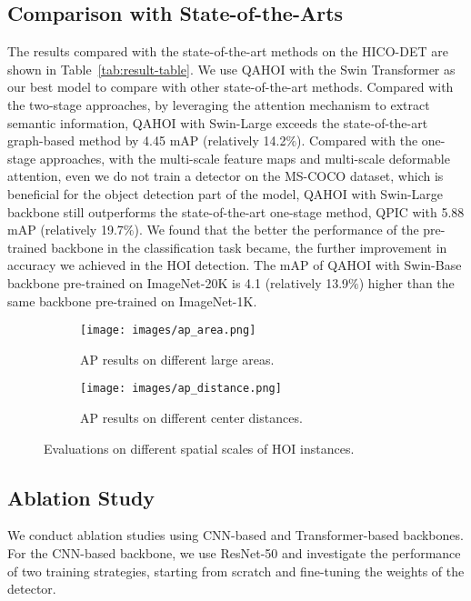 \documentclass[10pt,twocolumn,letterpaper]{article}
\begin{document}
\subsection{Comparison with State-of-the-Arts}
The results compared with the state-of-the-art methods on the HICO-DET are shown in Table~\ref{tab:result-table}.
We use QAHOI with the Swin Transformer as our best model to compare with other state-of-the-art methods.
Compared with the two-stage approaches,
by leveraging the attention mechanism to extract semantic information, QAHOI with Swin-Large exceeds the state-of-the-art graph-based method \cite{zhang2020spatio} by 4.45 mAP (relatively 14.2$\%$).
Compared with the one-stage approaches,
with the multi-scale feature maps and multi-scale deformable attention, even we do not train a detector on the MS-COCO dataset, which is beneficial for the object detection part of the model,
QAHOI with Swin-Large backbone still outperforms the state-of-the-art one-stage method, QPIC with 5.88 mAP (relatively 19.7$\%$).
We found that the better the performance of the pre-trained backbone in the classification task became, the further improvement in accuracy we achieved in the HOI detection.
The mAP of QAHOI with Swin-Base backbone pre-trained on ImageNet-20K is 4.1 (relatively 13.9$\%$) higher than the same backbone pre-trained on ImageNet-1K.

\begin{figure*}
  \centering
  \begin{subfigure}{0.48\linewidth}
    \centering
    \texttt{[image: images/ap\_area.png]}
    \caption{AP results on different large areas.}
    \label{fig:spatial_area}
  \end{subfigure}
  \begin{subfigure}{0.48\linewidth}
    \centering
    \texttt{[image: images/ap\_distance.png]}
    \caption{AP results on different center distances.}
    \label{fig:spatial_distance}
  \end{subfigure}
  \caption{Evaluations on different spatial scales of HOI instances.}
  \label{fig:results_in_spatial}
\end{figure*}
\subsection{Ablation Study}
We conduct ablation studies using CNN-based and Transformer-based backbones. 
For the CNN-based backbone, we use ResNet-50 and investigate the performance of two training strategies, starting from scratch and fine-tuning the weights of the detector. 
\end{document}
